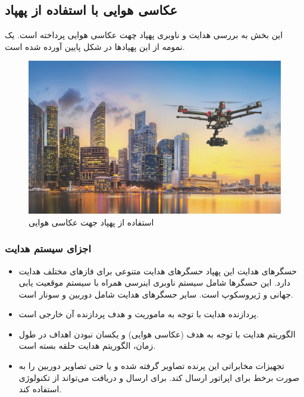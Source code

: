 \subsection{عکاسی هوایی با استفاده از پهپاد}
این بخش به بررسی هدایت و ناوبری پهپاد چهت عکاسی هوایی پرداخته است. یک نمومه از این پهپادها در شکل پایین آورده شده است.
 \begin{figure}[H]
	\centering
	\includegraphics[width=\linewidth]{../Figure/Q1/UAV-on-City.jpg}
	\caption{استفاده از پهپاد جهت عکاسی هوایی
	}
\end{figure}
\subsubsection{اجزای سیستم هدایت}
\begin{itemize}
	\item حسگرهای هدایت
	این پهپاد حسگرهای هدایت متنوعی برای فازهای مختلف هدایت دارد. این حسگرها شامل سیستم ناوبری اینرسی
	همراه با سیستم موقعیت یابی جهانی
	و ژیروسکوپ
	است. سایر حسگرهای هدایت شامل دوربین و سونار
	است.
	\item پردازنده هدایت
	با توجه به ماموریت و هدف پردازنده آن خارجی است.
	\item الگوریتم هدایت
	با توجه به هدف (عکاسی هوایی) و یکسان نبودن اهداف در طول زمان، الگوریتم هدایت حلقه بسته است.
	\item تجهیزات مخابراتی
	این پرنده تصاویر گرفته شده و یا حتی تصاویر دوربین را به صورت برخط 
	برای اپراتور ارسال کند. برای ارسال و دریافت می‌تواند از تکنولوژی 
	استفاده کند.
\end{itemize}


